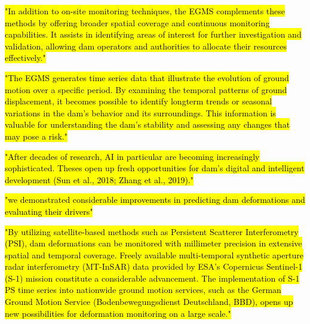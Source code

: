 \documentclass[11pt,a4paper]{article}
\begin{document}
\hl{\mbox{\parencite{ruiz-armenteros2023}} "In addition to on-site monitoring techniques, the EGMS complements these methods by offering broader spatial coverage and continuous monitoring capabilities. It assists in identifying areas of interest for further investigation and validation, allowing dam operators and authorities to allocate their resources effectively."}

\hl{\mbox{\parencite{ruiz-armenteros2023}} "The EGMS generates time series data that illustrate the evolution of ground motion over a specific period. By examining the temporal patterns of ground displacement, it becomes possible to identify longterm trends or seasonal variations in the dam's behavior and its surroundings. This information is valuable for understanding the dam's stability and assessing any changes that may pose a risk."}

\hl{\mbox{\parencite{cao2025}} "After decades of research, AI in particular are becoming increasingly sophisticated. Theses open up fresh opportunities for dam’s digital and intelligent development (Sun et al., 2018; Zhang et al., 2019)."}

\hl{\mbox{\parencite{ziemer2025}} "we demonstrated considerable improvements in predicting dam deformations and evaluating their drivers"}

\hl{\mbox{\parencite{ziemer2025}} "By utilizing satellite-based methods such as Persistent Scatterer Interferometry (PSI), dam deformations can be monitored with millimeter precision in extensive spatial and temporal coverage. Freely available multi-temporal synthetic aperture radar interferometry (MT-InSAR) data provided by ESA’s Copernicus Sentinel-1 (S-1) mission constitute a considerable advancement. The implementation of S-1 PS time series into nationwide ground motion services, such as the German Ground Motion Service (Bodenbewegungsdienst Deutschland, BBD), opens up new possibilities for deformation monitoring on a large scale."}



\end{document}
